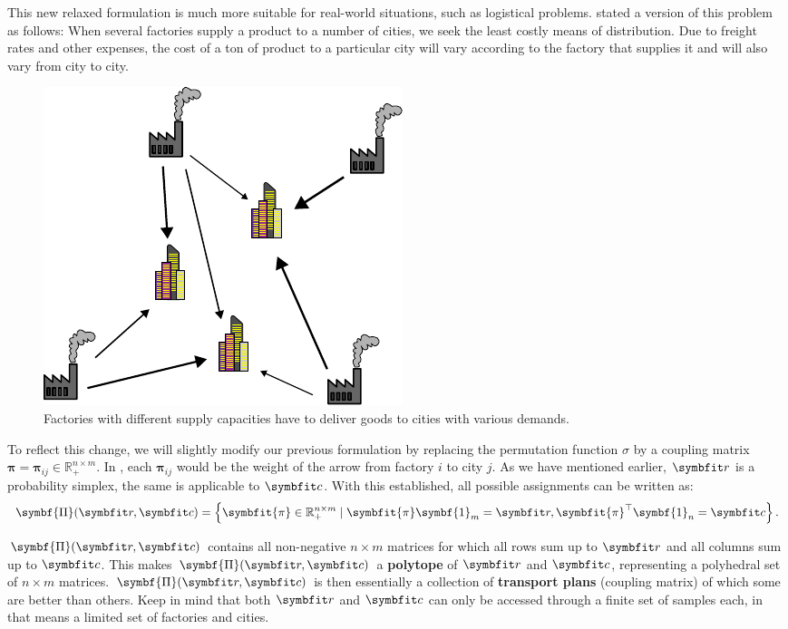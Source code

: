 This new relaxed formulation is much more suitable for real-world situations, such as logistical problems. \textcite{hitchcock1941distribution} stated a version of this problem as follows:
When several factories supply a product to a number of cities, we seek the least costly means of distribution. Due to freight rates and other expenses, the cost of a ton of product to a particular city will vary according to the factory that supplies it and will also vary from city to city.
\begin{figure}[ht]
    \centering
    \includegraphics{chapters/assets/ot/logistic.pdf}
    \caption{Factories with different supply capacities have to deliver goods to cities with various demands.}
    \label{fig:ot-factories}
\end{figure}

To reflect this change, we will slightly modify our previous formulation by replacing the permutation function $\sigma$ by a coupling matrix $\symbf{\pi} = \symbf{\pi}_{i j} \in \mathbb{R}_{+}^{n \times m}$. In , each $\symbf{\pi}_{i j}$ would be the weight of the arrow from factory $i$ to city $j$.
As we have mentioned earlier, $\bfitr$ is a probability simplex, the same is applicable to $\bfitc$. With this established, all possible assignments can be written as:
\begin{equation} 
\label{eqn:ot-def}
\symbf{\Pi}(\bfitr, \bfitc)=\left\{\symbfit{\pi} \in \mathbb{R}_{+}^{n \times m} \mid \symbfit{\pi} \symbf{1}_{m}=\bfitr, \symbfit{\pi}^{\top} \symbf{1}_{n}=\bfitc\right\}.
\end{equation}

$\symbf{\Pi}(\bfitr, \bfitc)$ contains all non-negative $n \times m$ matrices for which all rows sum up to $\bfitr$ and all columns sum up to $\bfitc$. 
This makes $\symbf{\Pi}(\bfitr, \bfitc)$ a \textbf{polytope} of $\bfitr$ and $\bfitc$, representing a polyhedral set of $n \times m$ matrices.
$\symbf{\Pi}(\bfitr, \bfitc)$ is then essentially a collection of \textbf{transport plans} (coupling matrix) of which some are better than others.
Keep in mind that both $\bfitr$ and $\bfitc$ can only be accessed through a finite set of samples each, in  that means a limited set of factories and cities.

